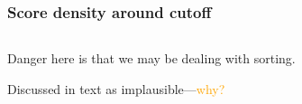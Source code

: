 \documentclass[12pt,english,dvipsnames,aspectratio=169,handout]{beamer}\usepackage[]{graphicx}\usepackage[]{xcolor}
\begin{document}
\begin{frame}
\frametitle{Score density around cutoff}

\begin{columns}
	\begin{column}{0.35\textwidth}
	Danger here is that we may be dealing with sorting.\bigskip
	
	Discussed in text as implausible---\textcolor{orange}{why?}
	\end{column}\pause
	\begin{column}{0.65\textwidth}
		\begin{figure}
    \centering
    \end{figure}
	\end{column}
\end{columns}


\end{frame}
\end{document}
